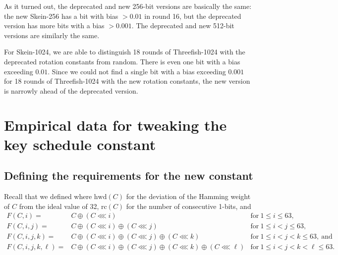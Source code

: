 \documentclass[11pt,twoside]{article}
\newcommand{\rol}{\mathbin{\lll}}
\begin{document}
As it turned out, the deprecated and new 256-bit versions are basically the same: the new Skein-256 has a bit with bias $>0.01$ in round 16, but the deprecated version has more bits with a bias $>0.001$. The deprecated and new 512-bit versions are similarly the same.

For Skein-1024, we are able to distinguish 18 rounds of Threefish-1024 with the deprecated rotation constants from random. There is even one bit with a bias exceeding $0.01$. Since we could not find a single bit with a bias exceeding $0.001$ for 18 rounds of Threefish-1024 with the new rotation constants, the new version is narrowly ahead of the deprecated version.

\section{Empirical data for tweaking the key schedule constant}
  \label{sec:empiricalks}

\subsection{Defining the requirements for the new constant}

Recall that we defined where $\mbox{hwd}(C)$ for the deviation of the Hamming
weight of $C$ from the ideal value of 32, $\mbox{rc}(C)$ for the number of
consecutive 1-bits, and 
\begin{eqnarray*}
   F(C,i)   = & C \oplus (C \rol i) & \mbox{for}\ 1 \le i \le 63, \\
   F(C,i,j) = & C \oplus (C \rol i) \oplus (C \rol j) &
    \mbox{for}\ 1 \le i < j \le 63,
   \\  
   F(C,i,j,k) = & C \oplus (C \rol i) \oplus (C \rol j) \oplus (C \rol k) &
    \mbox{for}\ 1 \le i < j < k \le 63, \ \mbox{and}
  \\
    F(C,i,j,k,\ell) = & C \oplus (C \rol i) \oplus (C \rol j) 
                      \oplus (C \rol k) \oplus (C \rol \ell) &
    \mbox{for}\ 1 \le i < j < k <  \ell \le 63.
\end{eqnarray*}
\end{document}
